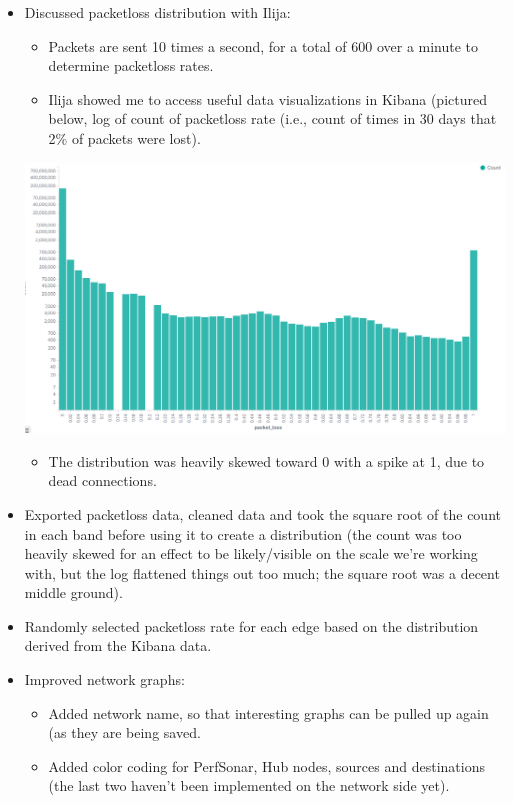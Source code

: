 \documentclass{weeklyreport}
\begin{document}
\begin{itemize}
    \item Discussed packetloss distribution with Ilija:
    \begin{itemize}
    	\item Packets are sent 10 times a second, for a total of 600 over a minute to determine packetloss rates.
    	\item Ilija showed me to access useful data visualizations in Kibana (pictured below, log of count of packetloss rate (i.e., count of times in 30 days that 2\% of packets were lost).
	\end{itemize}

    {\centering \includegraphics[width=\linewidth]{week_2/packetloss.png}}
    
	\begin{itemize}
    	\item The distribution was heavily skewed toward 0 with a spike at 1, due to dead connections.
	\end{itemize}     
	\item Exported packetloss data, cleaned data and took the square root of the count in each band before using it to create a distribution (the count was too heavily skewed for an effect to be likely/visible on the scale we're working with, but the log flattened things out too much; the square root was a decent middle ground).
	\item Randomly selected packetloss rate for each edge based on the distribution derived from the Kibana data.
	\item Improved network graphs:
	\begin{itemize}
		\item Added network name, so that interesting graphs can be pulled up again (as they are being saved.
		\item Added color coding for PerfSonar, Hub nodes, sources and destinations (the last two haven't been implemented on the network side yet).
	\end{itemize}


\end{itemize}
\end{document}
